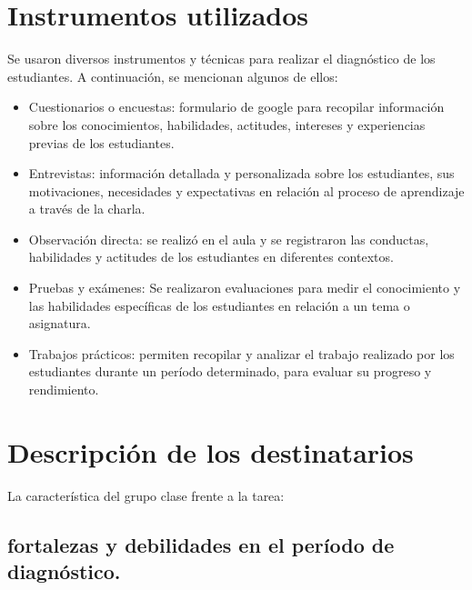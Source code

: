 \documentclass[a4paper,12pt]{book}
\begin{document}
\section{Instrumentos utilizados}

Se usaron diversos instrumentos y técnicas para realizar el diagnóstico de los estudiantes. A continuación, se mencionan algunos de ellos:
\begin{itemize}
    
\item Cuestionarios o encuestas: formulario de google para recopilar información sobre los conocimientos, habilidades, actitudes, intereses y experiencias previas de los estudiantes.

\item Entrevistas: información detallada y personalizada sobre los estudiantes, sus motivaciones, necesidades y expectativas en relación al proceso de aprendizaje a través de la charla.

\item Observación directa: se realizó en el aula y se registraron las conductas, habilidades y actitudes de los estudiantes en diferentes contextos.

\item Pruebas y exámenes: Se realizaron evaluaciones para medir el conocimiento y las habilidades específicas de los estudiantes en relación a un tema o asignatura.

\item Trabajos prácticos: permiten recopilar y analizar el trabajo realizado por los estudiantes durante un período determinado, para evaluar su progreso y rendimiento.
\end{itemize}

\section{Descripción de los destinatarios}
La característica del grupo clase frente a la tarea:

\subsection{fortalezas y debilidades en el período de diagnóstico.}
\end{document}
